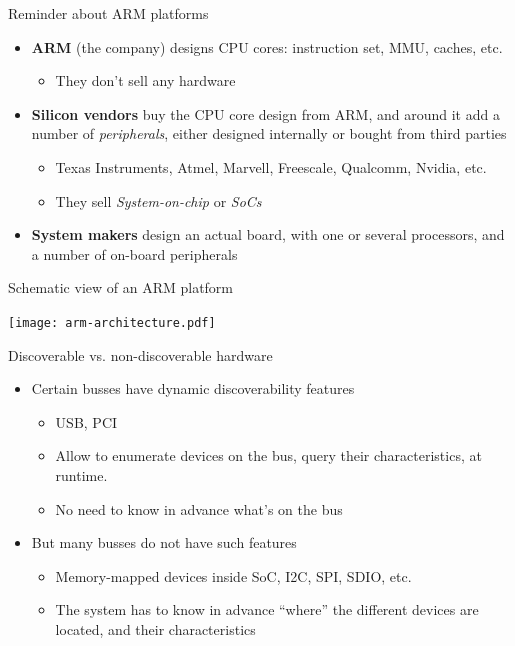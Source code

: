\documentclass[obeyspaces,spaces,hyphens]{beamer}
\begin{document}
\begin{frame}{Reminder about ARM platforms}
  \begin{itemize}
  \item {\bf ARM} (the company) designs CPU cores: instruction set, MMU, caches, etc.
    \begin{itemize}
    \item They don't sell any hardware
    \end{itemize}
  \item {\bf Silicon vendors} buy the CPU core design from ARM, and
    around it add a number of {\em peripherals}, either designed
    internally or bought from third parties
    \begin{itemize}
    \item Texas Instruments, Atmel, Marvell, Freescale, Qualcomm,
      Nvidia, etc.
    \item They sell {\em System-on-chip} or {\em SoCs}
    \end{itemize}
  \item {\bf System makers} design an actual board, with one or
    several processors, and a number of on-board peripherals
  \end{itemize}
\end{frame}

\begin{frame}{Schematic view of an ARM platform}
  \begin{center}
    \texttt{[image: arm-architecture.pdf]}
  \end{center}
\end{frame}

\begin{frame}{Discoverable vs. non-discoverable hardware}
  \begin{itemize}
  \item Certain busses have dynamic discoverability features
    \begin{itemize}
    \item USB, PCI
    \item Allow to enumerate devices on the bus, query their
      characteristics, at runtime.
    \item No need to know in advance what's on the bus
    \end{itemize}
  \item But many busses do not have such features
    \begin{itemize}
    \item Memory-mapped devices inside SoC, I2C, SPI, SDIO, etc.
    \item The system has to know in advance ``where'' the different
      devices are located, and their characteristics
    \end{itemize}
  \end{itemize}
\end{frame}
\end{document}
